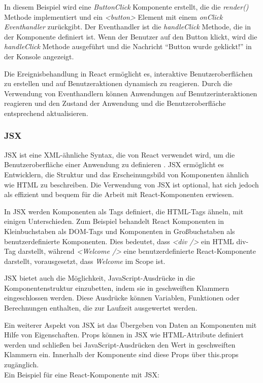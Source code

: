 In diesem Beispiel wird eine \emph{ButtonClick} Komponente erstellt, die die \emph{render()} Methode implementiert und ein \emph{<button>} Element mit einem \emph{onClick Eventhandler} zurückgibt. Der Eventhandler ist die \emph{handleClick} Methode, die in der Komponente definiert ist. Wenn der Benutzer auf den Button klickt, wird die \emph{handleClick} Methode ausgeführt und die Nachricht "`Button wurde geklickt!"' in der Konsole angezeigt. \cite{react_de_handling_events}

Die Ereignisbehandlung in React ermöglicht es, interaktive Benutzeroberflächen zu erstellen und auf Benutzeraktionen dynamisch zu reagieren. Durch die Verwendung von Eventhandlern können Anwendungen auf Benutzerinteraktionen reagieren und den Zustand der Anwendung und die Benutzeroberfläche entsprechend aktualisieren.

\subsubsection{JSX}
JSX ist eine XML-ähnliche Syntax, die von React verwendet wird, um die Benutzeroberfläche einer Anwendung zu definieren \cite{deLegacyReactjs}. JSX ermöglicht es Entwicklern, die Struktur und das Erscheinungsbild von Komponenten ähnlich wie HTML zu beschreiben. Die Verwendung von JSX ist optional, hat sich jedoch als effizient und bequem für die Arbeit mit React-Komponenten erwiesen.

In JSX werden Komponenten als Tags definiert, die HTML-Tags ähneln, mit einigen Unterschieden. Zum Beispiel behandelt React Komponenten in Kleinbuchstaben als DOM-Tags und Komponenten in Großbuchstaben als benutzerdefinierte Komponenten\cite{ReactComponentsAndProps}. Dies bedeutet, dass \emph{<div />} ein HTML div-Tag darstellt, während \emph{<Welcome />} eine benutzerdefinierte React-Komponente darstellt, vorausgesetzt, dass \emph{Welcome} im Scope ist.

JSX bietet auch die Möglichkeit, JavaScript-Ausdrücke in die Komponentenstruktur einzubetten, indem sie in geschweiften Klammern {} eingeschlossen werden. Diese Ausdrücke können Variablen, Funktionen oder Berechnungen enthalten, die zur Laufzeit ausgewertet werden.

Ein weiterer Aspekt von JSX ist das Übergeben von Daten an Komponenten mit Hilfe von Eigenschaften. Props können in JSX wie HTML-Attribute definiert werden und schließen bei JavaScript-Ausdrücken den Wert in geschweiften Klammern ein\cite{deLegacyReactjs}. Innerhalb der Komponente sind diese Props über this.props zugänglich.\\
Ein Beispiel für eine React-Komponente mit JSX: 

